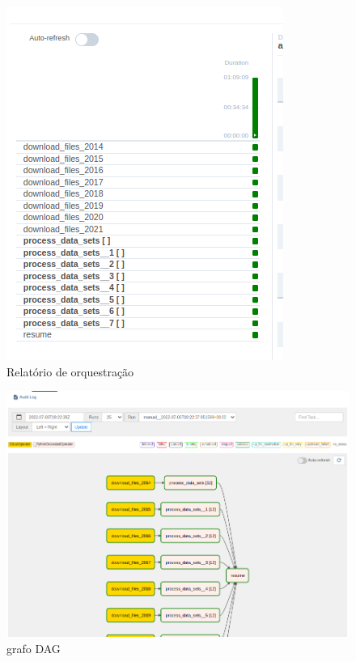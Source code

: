 \documentclass[10pt,brazil]{beamer}
\theoremstyle{definition}
\begin{document}
\begin{frame}[plain]
  \hspace*{-10mm}
  \begin{figure}
    \centering  
  \includegraphics[width=.5\paperwidth]{report_execution_summary.png}
      \caption[Airflow relatório]{Relatório de orquestração}
  \end{figure}  
\end{frame}

\begin{frame}[plain]
  \hspace*{-10mm}
  \begin{figure}
    \centering  
  \includegraphics[width=.75\paperwidth]{graph_execution.png}
      \caption[Airflow relatório]{grafo DAG}
  \end{figure}  
\end{frame}
\end{document}
